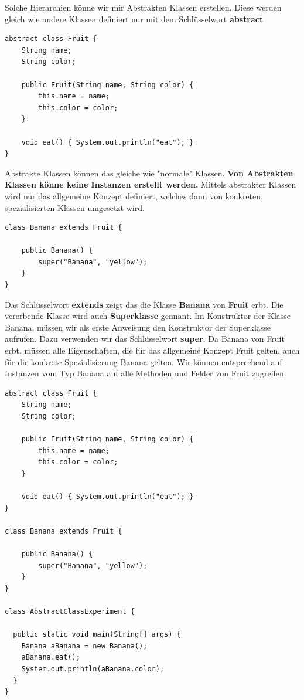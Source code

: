 \documentclass[12pt]{article}
\begin{document}
    Solche Hierarchien könne wir mir Abstrakten Klassen erstellen. Diese werden gleich wie andere Klassen definiert nur mit dem Schlüsselwort \textbf{abstract} 

    \begin{lstlisting}[caption=abstrakte Klasse]
abstract class Fruit {
    String name;
    String color;

    public Fruit(String name, String color) {
        this.name = name;
        this.color = color;
    }
    
    void eat() { System.out.println("eat"); }
}
    \end{lstlisting}

    Abstrakte Klassen können das gleiche wie "normale" Klassen. \textbf{Von Abstrakten Klassen könne keine
    Instanzen erstellt werden. }
    Mittels abstrakter Klassen wird nur das allgemeine Konzept definiert, welches dann von konkreten, spezialisierten Klassen umgesetzt wird.


    \begin{lstlisting}[caption=Fruit]
class Banana extends Fruit {

    public Banana() {
        super("Banana", "yellow");
    }
}
    \end{lstlisting}

    Das Schlüsselwort \textbf{extends} zeigt das die Klasse \textbf{Banana} von \textbf{Fruit} erbt. 
    Die vererbende Klasse wird auch \textbf{Superklasse} gennant. 
    Im Konstruktor der Klasse Banana, müssen wir als erste Anweisung den Konstruktor der Superklasse aufrufen. Dazu verwenden wir das Schlüsselwort \textbf{super}.
    Da Banana von Fruit erbt, müssen alle Eigenschaften, die für das allgemeine Konzept Fruit gelten, auch für die konkrete Spezialisierung Banana gelten. 
    Wir können entsprechend auf Instanzen vom Typ Banana auf alle Methoden und Felder von Fruit zugreifen.

    \begin{lstlisting}[caption=Beispiel Superklasse]
abstract class Fruit {
    String name;
    String color;

    public Fruit(String name, String color) {
        this.name = name;
        this.color = color;
    }
    
    void eat() { System.out.println("eat"); }
}

class Banana extends Fruit {

    public Banana() {
        super("Banana", "yellow");
    }
}

class AbstractClassExperiment {
  
  public static void main(String[] args) {
    Banana aBanana = new Banana();
    aBanana.eat();
    System.out.println(aBanana.color);
  }
}
    \end{lstlisting}
\end{document}
